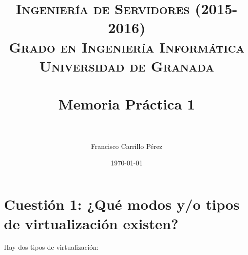 

\title{	
\normalfont \normalsize 
\textsc{{\bf Ingeniería de Servidores (2015-2016)} \\ Grado en Ingeniería Informática \\ Universidad de Granada} \\ [25pt] %
\horrule{0.5pt} \\[0.4cm] %
\huge Memoria Práctica 1 \\ %
\horrule{2pt} \\[0.5cm] %
}

\author{Francisco Carrillo Pérez} %

\date{\normalsize\today} %




\maketitle %

\newpage %

\tableofcontents %

\listoffigures

\listoftables

\newpage



\section{Cuestión 1: ¿Qué modos y/o tipos de virtualización existen? }

Hay dos tipos de virtualización: \cite{virtual} \cite{ibmvirtualization}


